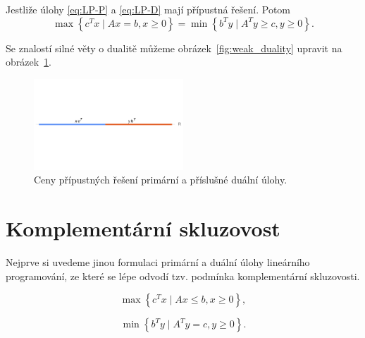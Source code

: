 \begin{vt}
    Jestliže úlohy \ref{eq:LP-P} a \ref{eq:LP-D} mají přípustná řešení. Potom
    $$
        \max \left\{ c^T x \mid Ax = b, x \geq 0 \right\} = \min \left\{ b^T y \mid A^T y \geq c, y \geq 0 \right\}.
    $$ 
\end{vt}
Se znalostí silné věty o dualitě můžeme obrázek~\ref{fig:weak_duality} upravit na obrázek~\ref{fig:strong_duality}.

\begin{figure}[h!]
    \centering
    \includegraphics[width=0.5\textwidth]{img/strong_duality.png}
    \caption{Ceny přípustných řešení primární a příslušné duální úlohy.}
    \label{fig:strong_duality}
\end{figure}

\section{Komplementární skluzovost}

Nejprve si uvedeme jinou formulaci primární a duální úlohy lineárního programování, ze které se lépe odvodí tzv. podmínka komplementární skluzovosti.

\begin{equation}\tag{LP-P2}
    \max \left\{ c^T x \mid Ax \leq b, x \geq 0 \right\},
    \label{eq:LP-P2}
\end{equation}

\begin{equation}\tag{LP-D2}
    \min \left\{ b^T y \mid A^T y = c, y \geq 0 \right\}.
    \label{eq:LP-D2}
\end{equation}

